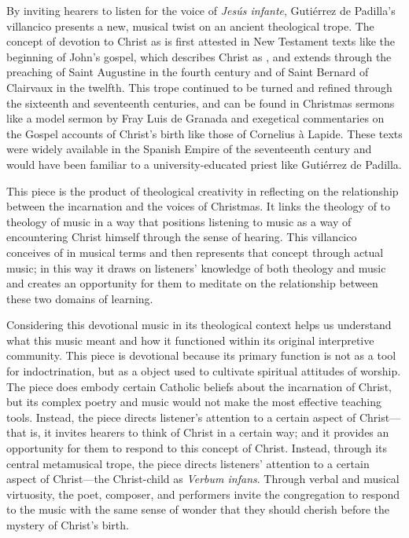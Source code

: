 By inviting hearers to listen for the voice of \emph{Jesús infante}, Gutiérrez
de Padilla's villancico presents a new, musical twist on an ancient theological
trope.
The concept of devotion to Christ as  is first attested
in New Testament texts like the beginning of John's gospel, which describes
Christ as , and extends through the preaching of
Saint Augustine in the fourth century and of Saint Bernard of Clairvaux in the
twelfth.
This trope continued to be turned and refined through the sixteenth and
seventeenth centuries, and can be found in Christmas sermons like a model sermon
by Fray Luis de Granada and exegetical commentaries on the Gospel accounts of
Christ's birth like those of Cornelius à Lapide.
These texts were widely available in the Spanish Empire of the seventeenth
century and would have been familiar to a university-educated priest like
Gutiérrez de Padilla.

This piece is the product of theological creativity in reflecting on the
relationship between the incarnation and the voices of Christmas. 
It links the theology of  to theology of music in a way that
positions listening to music as a way of encountering Christ himself through the
sense of hearing.
This villancico conceives of  in musical terms and then
represents that concept through actual music; in this way it draws on listeners'
knowledge of both theology and music and creates an opportunity for them to
meditate on the relationship between these two domains of learning.

Considering this devotional music in its theological context helps us understand
what this music meant and how it functioned within its original interpretive
community.
This piece is devotional because its primary function is not as a tool for
indoctrination, but as a object used to cultivate spiritual attitudes of
worship.
The piece does embody certain Catholic beliefs about the incarnation of Christ,
but its complex poetry and music would not make the most effective teaching
tools.
Instead, the piece directs listener's attention to a certain aspect of
Christ---that is, it invites hearers to think of Christ in a certain way; and it
provides an opportunity for them to respond to this concept of Christ.
Instead, through its central metamusical trope, the piece directs listeners'
attention to a certain aspect of Christ---the Christ-child as \emph{Verbum
infans}.
Through verbal and musical virtuosity, the poet, composer, and performers invite
the congregation to respond to the music with the same sense of wonder that they
should cherish before the mystery of Christ's birth.

